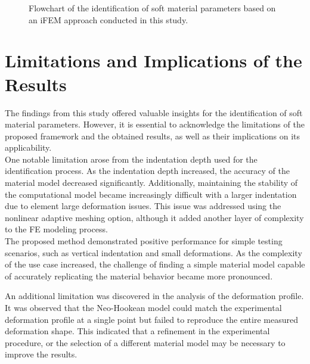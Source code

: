 \begin{figure}
\begin{center}
    \end{center}
    \caption[Framework proposal]{Flowchart of the identification of soft material parameters based on an iFEM approach conducted in this study.}%
    \label{fig:flowchart}%
 \end{figure}
     

\section{Limitations and Implications of the Results}
The findings from this study offered valuable insights for the identification of soft material 
parameters. However, it is essential to acknowledge the limitations of the proposed framework and 
the obtained results, as well as their implications on its applicability.\\

One notable limitation arose from the indentation depth used for the identification process. 
As the indentation depth increased, the accuracy of the material model decreased significantly.
Additionally, maintaining the stability of the computational model became increasingly 
difficult with a larger indentation due to element large deformation issues. This
issue was addressed using the nonlinear adaptive meshing option, although it added 
another layer of complexity to the FE modeling process.\\

The proposed method demonstrated positive performance for simple testing scenarios, such 
as vertical indentation and small deformations. As the complexity of the use case increased,
the challenge of finding a simple material model capable of accurately replicating the material 
behavior became more pronounced. 

An additional limitation was discovered in the analysis of the deformation profile.
It was observed that the Neo-Hookean model could match the experimental deformation
profile at a single point but failed to reproduce the entire measured deformation shape.
This indicated that a refinement in the experimental procedure, or the selection of a 
different material model may be necessary to improve the results.\\

